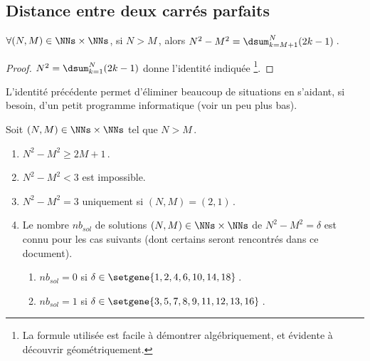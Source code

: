 \subsection{Distance entre deux carrés parfaits}

	
\begin{fact} \label{dist-square}
	$\forall (N, M) \in \NNs \times \NNs$, 
	si $N > M$\,, alors $N^2 - M^2 = \dsum_{k=M+1}^{N} (2 k - 1)$\,.
\end{fact}


\begin{proof}
	$N^2 = \dsum_{k=1}^{N} (2 k - 1)$ donne l'identité indiquée
	\footnote{
		La formule utilisée est facile à démontrer algébriquement, et évidente à découvrir géométriquement.
	}.
\end{proof}




L'identité précédente permet d'éliminer beaucoup de situations en s'aidant, si besoin, d'un petit programme informatique (voir un peu plus bas).

\begin{fact} \label{diff-square-ko}
	Soit $(N, M) \in \NNs \times \NNs$ tel que $N > M$\,.
	\begin{enumerate}
		\item $N^2 - M^2 \geq 2M + 1$\,.
		
		\item $N^2 - M^2 < 3$ est impossible.
		
		\item $N^2 - M^2 = 3$ uniquement si $(N, M) = (2, 1)$\,.
		
		\item Le nombre $nb_{sol}$ de solutions $(N, M) \in \NNs \times \NNs$ de $N^2 - M^2 = \delta$ est connu pour les cas suivants (dont certains seront rencontrés dans ce document).
		\begin{enumerate}
			\item $nb_{sol}= 0$ si $\delta \in \setgene{1, 2, 4, 6, 10, 14, 18}$\,.

			\item $nb_{sol}= 1$ si $\delta \in \setgene{3, 5, 7, 8, 9, 11, 12, 13, 16}$\,.
		\end{enumerate}
	\end{enumerate}
\end{fact}


